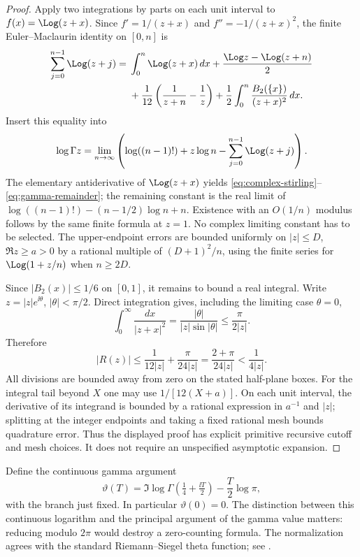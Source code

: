 \begin{proof}
Apply two integrations by parts on each unit interval to
$f(x)=\Log(z+x)$. Since $f'=1/(z+x)$ and $f''=-1/(z+x)^2$, the finite
Euler--Maclaurin identity on $[0,n]$ is
\begin{align*}
 \sum_{j=0}^{n-1}\Log(z+j)
 ={}&\int_0^n\Log(z+x)\,dx
     +\frac{\Log z-\Log(z+n)}2\\
 &+\frac1{12}\left(\frac1{z+n}-\frac1z\right)
   +\frac12\int_0^n\frac{B_2(\{x\})}{(z+x)^2}\,dx.
\end{align*}
Insert this equality into
\[
 \log\Gamma z=
 \lim_{n\to\infty}\left(\log((n-1)!)+z\log n
                 -\sum_{j=0}^{n-1}\Log(z+j)\right).
\]
The elementary antiderivative of $\Log(z+x)$ yields
\eqref{eq:complex-stirling}--\eqref{eq:gamma-remainder}; the
remaining constant is the real limit of
$\log((n-1)!)-(n-1/2)\log n+n$. Existence with an $O(1/n)$ modulus
follows by the same finite formula at $z=1$. No complex limiting
constant has to be selected. The upper-endpoint errors are bounded
uniformly on $|z|\le D$, $\Re z\ge a>0$ by a rational multiple of
$(D+1)^2/n$, using the finite series for $\Log(1+z/n)$ when $n\ge2D$.

Since $|B_2(x)|\le1/6$ on $[0,1]$, it remains to bound a real
integral. Write $z=|z|e^{\ii\theta}$, $|\theta|<\pi/2$. Direct
integration gives, including the limiting case $\theta=0$,
\[
 \int_0^\infty\frac{dx}{|z+x|^2}
 =\frac{|\theta|}{|z|\sin|\theta|}
 \le\frac{\pi}{2|z|}.
\]
Therefore
\[
 |R(z)|\le\frac1{12|z|}+\frac{\pi}{24|z|}
       =\frac{2+\pi}{24|z|}<\frac1{4|z|}.
\]
All divisions are bounded away from zero on the stated half-plane
boxes. For the integral tail beyond $X$ one may use
$1/[12(X+a)]$. On each unit interval, the derivative of its integrand
is bounded by a rational expression in $a^{-1}$ and $|z|$; splitting
at the integer endpoints and taking a fixed rational mesh bounds
quadrature error. Thus the displayed proof has explicit primitive
recursive cutoff and mesh choices. It does not require an unspecified
asymptotic expansion.
\end{proof}

Define the continuous gamma argument
\begin{equation}
 \vartheta(T)=\Im\log\Gamma(\tfrac14+\tfrac{\ii T}2)
               -\frac T2\log\pi,
 \label{eq:theta-definition}
\end{equation}
with the branch just fixed. In particular $\vartheta(0)=0$.
The distinction between this continuous logarithm and the principal
argument of the gamma value matters: reducing modulo $2\pi$ would
destroy a zero-counting formula. The normalization agrees with the
standard Riemann--Siegel theta function; see
\cite{DLMFgamma,DLMFzeros}.

